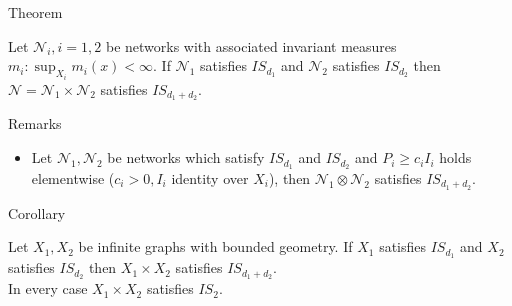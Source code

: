 \documentclass{beamer}\usepackage[]{graphicx}\usepackage[]{color}
\begin{document}
\begin{frame}[fragile]{Theorem}
\begin{theorem}
Let $\mathcal{N}_i,i=1,2$ be networks with associated invariant measures $m_i: \sup_{X_i} m_i(x)<\infty$. If $\mathcal{N}_1$ satisfies $IS_{d_1}$ and $\mathcal{N}_2$ satisfies $IS_{d_2}$ then $\mathcal{N} = \mathcal{N}_1 \times \mathcal{N}_2$ satisfies $IS_{d_1+d_2}$.
\end{theorem}
\end{frame}

\begin{frame}[fragile]{Remarks}
\begin{itemize}
\item Let $\mathcal{N}_1, \mathcal{N}_2$ be networks which satisfy $IS_{d_1}$ and $IS_{d_2}$ and $P_i \ge c_i I_i$ holds elementwise ($c_i > 0, I_i$ identity over $X_i$), then $\mathcal{N}_1 \otimes \mathcal{N}_2$ satisfies $IS_{d_1+d_2}$.
\end{itemize}
\end{frame}

\begin{frame}[fragile]{Corollary}
\begin{corollary}
Let $X_1, X_2$ be infinite graphs with bounded geometry. If $X_1$ satisfies $IS_{d_1}$ and $X_2$ satisfies $IS_{d_2}$ then $X_1 \times X_2$ satisfies $IS_{d_1+d_2}$.\\
In every case $X_1 \times X_2$ satisfies $IS_2$.
\end{corollary}
\end{frame}

\end{document}
